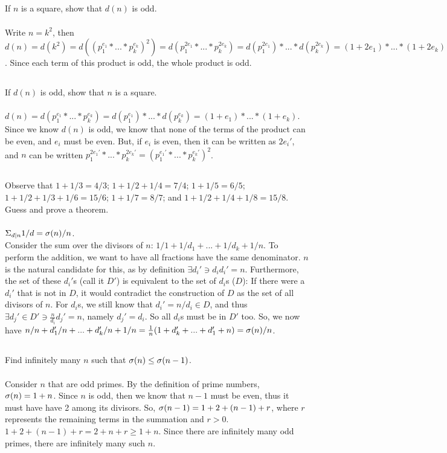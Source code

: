 \documentclass{article}
\begin{document}
\subsection{}
If $n$ is a square, show that $d(n)$ is odd.\\~\\
Write $n = k^2$, then $d(n) = d(k^2) = d((p_1^{e_1}*...*p_k^{e_k})^2) = 
d(p_1^{2e_1}*...*p_k^{2e_k}) = d(p_1^{2e_1})*...*d(p_k^{2e_k}) =
(1 + 2e_1)*...*(1 + 2e_k)$.
Since each term of this product is odd, the whole product is odd.

\subsection{}
If $d(n)$ is odd, show that $n$ is a square.\\~\\
$d(n) = d(p_1^{e_1}*...*p_k^{e_k}) = d(p_1^{e_1})*...*d(p_k^{e_k}) = 
(1 + e_1)*...*(1 + e_k)$.
Since we know $d(n)$ is odd, we know that none of the terms of the product can be
even, and $e_i$ must be even.
But, if $e_i$ is even, then it can be written as $2e_i'$,
and $n$ can be written $p_1^{2e_1'}*...*p_k^{2e_k'} =
(p_1^{e_1'}*...*p_k^{e_k'})^2$.

\subsection{}
Observe that $1 + 1/3 = 4/3$; $1 + 1/2 + 1/4 = 7/4$;
$1 + 1/5 = 6/5$; $1 + 1/2 + 1/3 + 1/6 = 15/6$; $1 + 1/7 = 8/7$;
and $1 + 1/2 + 1/4 + 1/8 = 15/8$.
Guess and prove a theorem.\\~\\
$\Sigma_{d|n}1/d = \sigma(n)/n$.\\
Consider the sum over the divisors of $n$: $1/1 + 1/d_1 + ... + 1/d_k + 1/n$.
To perform the addition, we want to have all fractions have the same denominator.
$n$ is the natural candidate for this, as by definition
$\exists d_i' \ni d_id_i' = n$.
Furthermore, the set of these $d_i'$s (call it $D'$) is equivalent to the
set of $d_i$s ($D$):
If there were a $d_i'$ that is not in $D$, it would contradict the construction
of $D$ as the set of all divisors of $n$.
For $d_i$s, we still know that $d_i' = n/d_i \in D$,
and thus $\exists d_j' \in D' \ni \frac{n}{d_i}d_j' = n$, namely $d_j' = d_i$.
So all $d_i$s must be in $D'$ too.
So, we now have $n/n + d_1'/n + ... + d_k'/n + 1/n = 
\frac{1}{n}(1 + d_k' + ... + d_1' + n) = \sigma(n)/n$.

\subsection{}
Find infinitely many $n$ such that $\sigma(n) \leq \sigma(n - 1)$.\\~\\
Consider $n$ that are odd primes.
By the definition of prime numbers, $\sigma(n) = 1 + n$.
Since $n$ is odd, then we know that $n - 1$ must be even,
thus it must have have 2 among its divisors.
So, $\sigma(n - 1) = 1 + 2 + (n - 1) + r$, where $r$ represents the remaining terms
in the summation and $r > 0$.
$1 + 2 + (n - 1) + r = 2 + n + r \geq 1 + n$.
Since there are infinitely many odd primes, there are infinitely many such $n$.
\end{document}
